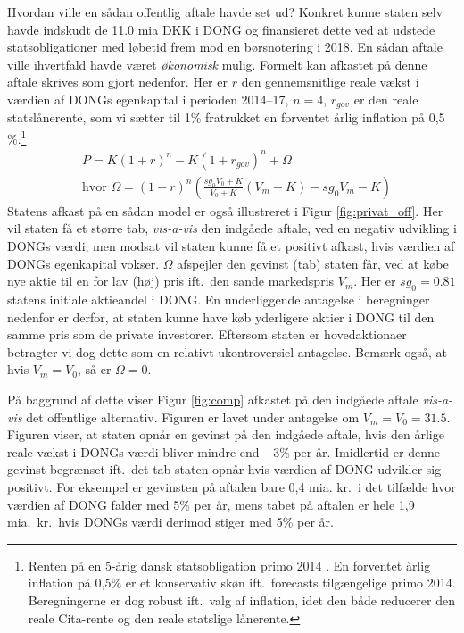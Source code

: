 \documentclass{article}
\begin{document}
Hvordan ville en sådan offentlig aftale havde set ud? Konkret kunne staten selv havde indskudt de 11.0 mia DKK i DONG og finansieret dette ved at udstede statsobligationer med løbetid frem mod en børsnotering i 2018. En sådan aftale ville ihvertfald havde været \emph{økonomisk} mulig. Formelt kan afkastet på denne aftale skrives som gjort nedenfor. Her er $r$ den gennemsnitlige reale vækst i værdien af DONGs egenkapital i perioden 2014--17, $n=4$, $r_{\mathit{gov}}$ er den reale statslånerente, som vi sætter til 1\% fratrukket en forventet årlig inflation på 0,5 \%.\footnote{Renten på en 5-årig dansk statsobligation primo 2014 \citep{NB2014}. En forventet årlig inflation på 0,5\% er et konservativ skøn ift.\ forecasts tilgængelige primo 2014. Beregningerne er dog robust ift.\ valg af inflation, idet den både reducerer den reale Cita-rente og den reale statslige lånerente.}
\begin{align}
&P=K(1+r)^n-K(1+r_{gov})^n +\Omega \\
&\text{hvor } \Omega=(1+r)^n\left( \frac{sg_0 V_0+K}{V_0+K} \left( V_m+K \right)-sg_0 V_m -K\right)\nonumber
\label{eq:gov_capital}
\end{align}
Statens afkast på en sådan model er også illustreret i Figur \ref{fig:privat_off}. Her vil staten få et større tab, \emph{vis-a-vis} den indgåede aftale, ved en negativ udvikling i DONGs værdi, men modsat vil staten kunne få et positivt afkast, hvis værdien af DONGs egenkapital vokser. $\Omega$ afspejler den gevinst (tab) staten får, ved at købe nye aktie til en for lav (høj) pris ift.\ den sande markedspris $V_m$. Her er $sg_0=0.81$ statens initiale aktieandel i DONG. En underliggende antagelse i beregninger nedenfor er derfor, at staten kunne have køb yderligere aktier i DONG til den samme pris som de private investorer. Eftersom staten er hovedaktionaer betragter vi dog dette som en relativt ukontroversiel antagelse. Bemærk også, at hvis $V_m=V_0$, så er $\Omega=0$.


På baggrund af dette viser Figur \ref{fig:comp} afkastet på den indgåede aftale \emph{vis-a-vis} det offentlige alternativ. Figuren er lavet under antagelse om  $V_m=V_0=31.5$. Figuren viser, at staten opnår en gevinst på den indgåede aftale, hvis den årlige reale vækst i DONGs værdi bliver mindre end $-3$\% per år. Imidlertid er denne gevinst begrænset ift.\ det tab staten opnår hvis værdien af DONG udvikler sig positivt. For eksempel er gevinsten på aftalen bare 0,4 mia. kr.\ i det tilfælde hvor værdien af DONG falder med 5\% per år, mens tabet på aftalen er hele 1,9 mia.\ kr.\ hvis DONGs værdi derimod stiger med 5\% per år.
\end{document}
